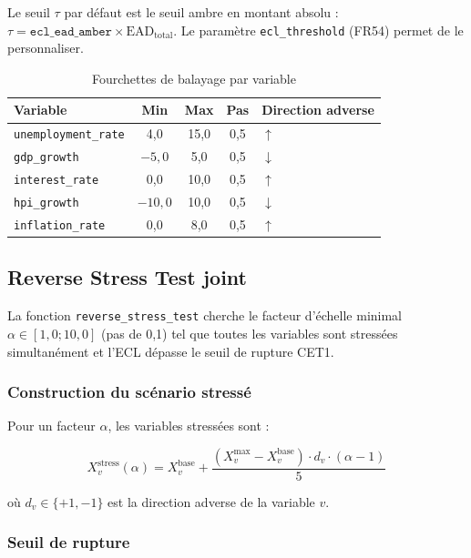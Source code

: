 \documentclass[12pt,a4paper]{article}
\begin{document}
Le seuil $\tau$ par d\'efaut est le seuil ambre en montant absolu :
$\tau = \texttt{ecl\_ead\_amber} \times \text{EAD}_{\text{total}}$.
Le param\`etre \texttt{ecl\_threshold} (FR54) permet de le personnaliser.

\begin{table}[htbp]
\centering
\caption{Fourchettes de balayage par variable}
\begin{tabular}{lcccl}
\toprule
\textbf{Variable} & \textbf{Min} & \textbf{Max} & \textbf{Pas} & \textbf{Direction adverse} \\
\midrule
\texttt{unemployment\_rate} & 4,0 & 15,0 & 0,5 & $\uparrow$ \\
\texttt{gdp\_growth} & $-5{,}0$ & 5,0 & 0,5 & $\downarrow$ \\
\texttt{interest\_rate} & 0,0 & 10,0 & 0,5 & $\uparrow$ \\
\texttt{hpi\_growth} & $-10{,}0$ & 10,0 & 0,5 & $\downarrow$ \\
\texttt{inflation\_rate} & 0,0 & 8,0 & 0,5 & $\uparrow$ \\
\bottomrule
\end{tabular}
\label{tab:sweep_ranges}
\end{table}

\subsection{Reverse Stress Test joint}

La fonction \texttt{reverse\_stress\_test} cherche le facteur d'\'echelle
minimal $\alpha \in [1{,}0 ; 10{,}0]$ (pas de 0,1) tel que toutes les variables
sont stress\'ees simultan\'ement et l'ECL d\'epasse le seuil de rupture CET1.

\subsubsection{Construction du sc\'enario stress\'e}

Pour un facteur $\alpha$, les variables stress\'ees sont :

\begin{equation}
    X_v^{\text{stress}}(\alpha) = X_v^{\text{base}}
    + \frac{(X_v^{\max} - X_v^{\text{base}}) \cdot d_v \cdot (\alpha - 1)}{5}
    \label{eq:stress_params}
\end{equation}

o\`u $d_v \in \{+1, -1\}$ est la direction adverse de la variable $v$.

\subsubsection{Seuil de rupture}
\end{document}
